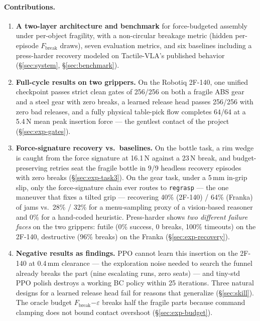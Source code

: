 \documentclass[11pt]{article}
\newcommand{\Fbreak}{\ensuremath{F_{\mathrm{break}}}}
\newcommand{\code}[1]{\texttt{\small #1}}
\begin{document}
\paragraph{Contributions.}
\begin{enumerate}
  \item \textbf{A two-layer architecture and benchmark} for force-budgeted assembly under per-object fragility, with a non-circular breakage metric (hidden per-episode \Fbreak{} draws), seven evaluation metrics, and six baselines including a press-harder recovery modeled on Tactile-VLA's published behavior (\S\ref{sec:system}, \S\ref{sec:benchmark}).
  \item \textbf{Full-cycle results on two grippers.} On the Robotiq 2F-140, one unified checkpoint passes strict clean gates of 256/256 on both a fragile ABS gear and a steel gear with zero breaks, a learned release head passes 256/256 with zero bad releases, and a fully physical table-pick flow completes 64/64 at a 5.4\,N mean peak insertion force --- the gentlest contact of the project (\S\ref{sec:exp-gates}).
  \item \textbf{Force-signature recovery vs.\ baselines.} On the bottle task, a rim wedge is caught from the force signature at 16.1\,N against a 23\,N break, and budget-preserving retries seat the fragile bottle in 9/9 headless recovery episodes with zero breaks (\S\ref{sec:exp-task3}). On the gear task, under a 5\,mm in-grip slip, only the force-signature chain ever routes to \code{regrasp} --- the one maneuver that fixes a tilted grip --- recovering 40\% (2F-140) / 64\% (Franka) of jams vs.\ 28\% / 32\% for a menu-sampling proxy of a vision-based reasoner and 0\% for a hand-coded heuristic. Press-harder shows \emph{two different failure faces} on the two grippers: futile (0\% success, 0 breaks, 100\% timeouts) on the 2F-140, destructive (96\% breaks) on the Franka (\S\ref{sec:exp-recovery}).
  \item \textbf{Negative results as findings.} PPO cannot learn this insertion on the 2F-140 at 0.4\,mm clearance --- the exploration noise needed to search the funnel already breaks the part (nine escalating runs, zero seats) --- and tiny-std PPO polish destroys a working BC policy within 25 iterations. Three natural designs for a learned release head fail for reasons that generalize (\S\ref{sec:skill}). The oracle budget \Fbreak$-\varepsilon$ breaks half the fragile parts because command clamping does not bound contact overshoot (\S\ref{sec:exp-budget}).
\end{enumerate}
\end{document}
